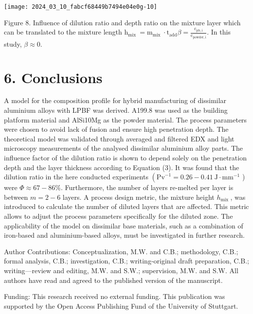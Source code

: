 \documentclass[10pt]{article}
\begin{document}
\begin{center}
\texttt{[image: 2024\_03\_10\_fabcf68449b7494e04e0g-10]}
\end{center}

Figure 8. Influence of dilution ratio and depth ratio on the mixture layer which can be translated to the mixture length $\mathrm{h}_{\text {mix }}=\mathrm{m}_{\text {mix }} \cdot \mathrm{t}_{\mathrm{add}} \beta=\frac{\mathrm{c}_{\mathrm{pb}, \mathrm{i}}}{\mathrm{c}_{\mathrm{powder}, \mathrm{i}}}$. In this study, $\beta \approx 0$.

\section*{6. Conclusions}
A model for the composition profile for hybrid manufacturing of dissimilar aluminium alloys with LPBF was derived. A199.8 was used as the building platform material and AlSi10Mg as the powder material. The process parameters were chosen to avoid lack of fusion and ensure high penetration depth. The theoretical model was validated through averaged and filtered EDX and light microscopy measurements of the analysed dissimilar aluminium alloy parts. The influence factor of the dilution ratio is shown to depend solely on the penetration depth and the layer thickness according to Equation (3). It was found that the dilution ratio in the here conducted experiments $\left(\mathrm{Pv}^{-1}=0.26-0.41 \mathrm{~J} \cdot \mathrm{mm}^{-1}\right.$ ) were $\Phi \approx 67-86 \%$. Furthermore, the number of layers re-melted per layer is between $m=2-6$ layers. A process design metric, the mixture height $h_{\text {mix }}$, was introduced to calculate the number of diluted layers that are affected. This metric allows to adjust the process parameters specifically for the diluted zone. The applicability of the model on dissimilar base materials, such as a combination of iron-based and aluminium-based alloys, must be investigated in further research.

Author Contributions: Conceptualization, M.W. and C.B.; methodology, C.B.; formal analysis, C.B.; investigation, C.B.; writing-original draft preparation, C.B.; writing—review and editing, M.W. and S.W.; supervision, M.W. and S.W. All authors have read and agreed to the published version of the manuscript.

Funding: This research received no external funding. This publication was supported by the Open Access Publishing Fund of the University of Stuttgart.
\end{document}
